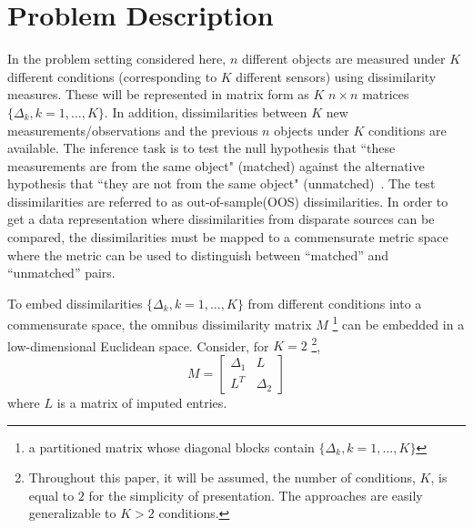 \documentclass[11pt]{article} %
\begin{document}
\section{Problem Description}
In the problem setting considered here, $n$ different objects are measured under $K$ different conditions (corresponding  to $K$ different sensors) using  dissimilarity measures. These will be represented in matrix form as $K$ $n \times n$ matrices $\{\Delta_k,k=1 ,\ldots,K\}$.  In addition,  dissimilarities between  $K$ new measurements/observations  and the previous 
$n$ objects under $K$ conditions are available.  The inference task is to   test the null hypothesis  that ``these measurements are from the same  object"  (matched) against the alternative hypothesis that ``they are not  from the same  object" (unmatched)~\cite{JOFC}. The test dissimilarities are referred to as  out-of-sample(OOS) dissimilarities.
  In order to get a data representation where dissimilarities from disparate sources can be compared, the dissimilarities must be mapped to a commensurate metric space where the metric can be used to distinguish between ``matched'' and ``unmatched'' pairs.


To embed dissimilarities  $\{\Delta_k,k=1 ,\ldots,K\}$  from different conditions into a commensurate space, the omnibus dissimilarity matrix  $M$ \footnote{a partitioned matrix whose diagonal blocks contain $\{\Delta_k,k=1 ,\ldots,K\}$}  can be embedded in a low-dimensional Euclidean space. Consider, for $K=2$ \footnote{Throughout this paper, it will be assumed,  the number of conditions, $K$, is equal to $2$ for the  simplicity of presentation. The approaches are easily generalizable to $K>2$ conditions.},
 \begin{equation}
M=  \left[ \begin{array}{cc}
         \Delta_1 & L\\
        L^T  & \Delta_2 
     \end{array}  \right]     \label{omnibus} 
\end{equation} where $L$ is a matrix of imputed entries. 
\end{document}
